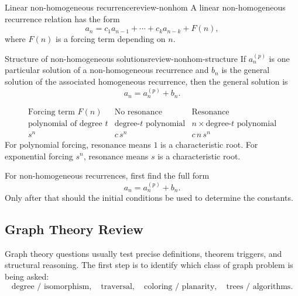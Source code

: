 \begin{definition}{Linear non-homogeneous recurrence}{review-nonhom}
A linear non-homogeneous recurrence relation has the form
\[
a_n=c_1a_{n-1}+\cdots+c_ka_{n-k}+F(n),
\]
where \(F(n)\) is a forcing term depending on \(n\).
\end{definition}

\begin{theorem}{Structure of non-homogeneous solutions}{review-nonhom-structure}
If \(a_n^{(p)}\) is one particular solution of a non-homogeneous recurrence and \(b_n\) is the general solution of the associated homogeneous recurrence, then the general solution is
\[
a_n=a_n^{(p)}+b_n.
\]
\end{theorem}

\begin{keyformula}[title={Particular-solution trial forms}]
\[
\begin{array}{c|c|c}
\text{Forcing term }F(n) & \text{No resonance} & \text{Resonance} \\ \hline
\text{polynomial of degree }t & \text{degree-}t\text{ polynomial} &
n\times\text{degree-}t\text{ polynomial} \\
s^n & c\,s^n & c\,n\,s^n
\end{array}
\]
For polynomial forcing, resonance means \(1\) is a characteristic root.
For exponential forcing \(s^n\), resonance means \(s\) is a characteristic root.
\end{keyformula}

\begin{commonmistake}[title={Using initial conditions too early}]
For non-homogeneous recurrences, first find the full form
\[
a_n=a_n^{(p)}+b_n.
\]
Only after that should the initial conditions be used to determine the constants.
\end{commonmistake}

\subsection{Graph Theory Review}

Graph theory questions usually test precise definitions, theorem triggers, and structural reasoning. The first step is to identify which class of graph problem is being asked:
\[
\text{degree / isomorphism},
\quad
\text{traversal},
\quad
\text{coloring / planarity},
\quad
\text{trees / algorithms}.
\]


